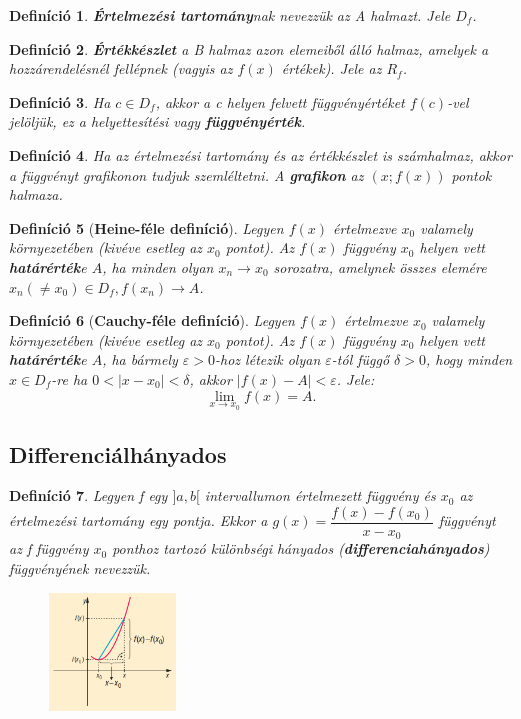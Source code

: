 \documentclass[12pt,a4paper]{article}
\newtheorem{definition}{Definíció} [section]
\begin{document}
\begin{definition}
\textbf{Értelmezési tartomány}nak nevezzük az A halmazt. Jele $D_f$.
\end{definition}

\begin{definition}
\textbf{Értékkészlet} a B halmaz azon elemeiből álló halmaz, amelyek a hozzárendelésnél fellépnek (vagyis az $f(x)$ értékek). Jele az $R_f$.
\end{definition}

\begin{definition}
Ha $c \in D_f$, akkor a c helyen felvett függvényértéket $f(c)$-vel jelöljük, ez a helyettesítési vagy \textbf{függvényérték}.
\end{definition}

\begin{definition}
Ha az értelmezési tartomány és az értékkészlet is számhalmaz, akkor a függvényt grafikonon tudjuk szemléltetni. A \textbf{grafikon} az $(x; f(x))$ pontok halmaza.
\end{definition}

\begin{definition}[\textbf{Heine-féle definíció}]
Legyen $f(x)$ értelmezve $x_0$ valamely környezetében (kivéve esetleg az $x_0$ pontot). Az $f(x)$ függvény $x_0$ helyen vett \textbf{határérték}e $A$, ha minden olyan $x_n\to x_0$ sorozatra, amelynek összes elemére $x_n(\neq x_0)\in D_f, f(x_n)\to A$.
\end{definition}

\begin{definition}[\textbf{Cauchy-féle definíció}]
Legyen $f(x)$ értelmezve $x_0$ valamely környezetében (kivéve esetleg az $x_0$ pontot). Az $f(x)$ függvény $x_0$ helyen vett \textbf{határérték}e $A$, ha bármely $\varepsilon>0$-hoz létezik olyan $\varepsilon$-tól függő $\delta>0$, hogy minden $x\in D_f$-re ha $0<|x-x_0|<\delta$, akkor $|f(x)-A|<\varepsilon$.
Jele:
\[\lim_{x\to x_0}f(x)=A.\]
\end{definition}

\subsection{Differenciálhányados}

\begin{definition}
Legyen f egy $]a, b[$ intervallumon értelmezett függvény és $x_0$ az értelmezési tartomány egy pontja. Ekkor a $g(x)=\dfrac{f(x)-f(x_0)}{x-x_0}$ függvényt az f függvény $x_0$ ponthoz tartozó különbségi hányados (\textbf{differenciahányados}) függvényének nevezzük.
\begin{figure}[h]
\centering
\includegraphics[width=0.3\textwidth]{differencialhanyados}
\end{figure}
\end{definition}
\end{document}
